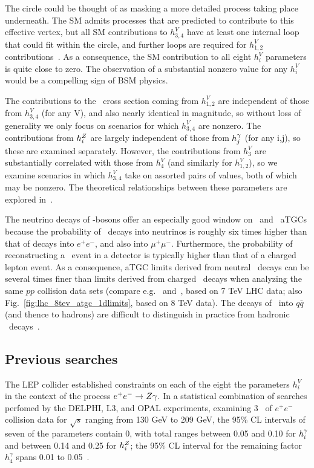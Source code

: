 \documentclass[oneside, letterpaper, 12pt, oldfontcommands]{memoir}
\begin{document}
The circle could be thought of as masking a more detailed process taking place underneath. The SM admits processes that are predicted to contribute
to this effective vertex, but all SM contributions to $h_{3,4}^{V}$ have at least one internal loop that could fit within the circle, and
further loops are required for $h_{1,2}^{V}$ contributions~\cite{ref:PhysRevD.47.4889}.
As a consequence, the SM contribution to all eight $h_{i}^{V}$ parameters is quite close to zero.
The observation of a substantial nonzero value for any $h_{i}^{V}$ would be a compelling sign of BSM physics.

The contributions to the \zinvg\ cross section coming from $h_{1,2}^{V}$ are independent of those from $h_{3,4}^{V}$ (for any V), and also nearly identical
in magnitude, so without loss of generality we only focus on scenarios for which $h_{3,4}^{V}$ are nonzero. The contributions
from $h_{i}^{Z}$ are largely independent of those from $h_{j}^{\gamma}$ (for any i,j), so these are examined separately.
However, the contributions from $h_{3}^{V}$ are substantially correlated with those from $h_{4}^{V}$ (and similarly for $h_{1,2}^{V}$), so we examine
scenarios in which $h_{3,4}^{V}$ take on assorted pairs of values, both of which may be nonzero. The theoretical relationships between these parameters
are explored in~\cite{ref:PhysRevD.47.4889}.

The neutrino decays of \PZ-bosons offer an especially good window on \PZ\PZ\Pgamma\ and \PZ\Pgamma\Pgamma\ aTGCs because the
probability of \PZ\ decays into neutrinos is roughly six times higher than that of decays into $e^\mathrm{+}e^\mathrm{-}$, and
also into $\mu^\mathrm{+}\mu^\mathrm{-}$. Furthermore, the probability of reconstructing a \zinvg\ event in a detector is typically
higher than that of a charged lepton event. As a consequence, aTGC limits derived from neutral \PZ\ decays can be several times
finer than limits derived from charged \PZ\ decays when analyzing the same $pp$ collision data sets (compare e.g.~\cite{ref:PhysRevD.89.092005} and~\cite{ref:JHEP10(2013)164},
based on 7 TeV LHC data; also Fig.~\ref{fig:lhc_8tev_atgc_1dlimits}, based on 8 TeV data).
The decays of \PZ\ into $q\bar{q}$ (and thence to hadrons) are difficult to distinguish in practice from hadronic \PW\ decays~\cite{ref:RevModPhys.89.035008}.

\subsection{Previous searches} \label{sec:introduction_aTGC_previous_searches}
The LEP collider established constraints on each of the eight the parameters $h_{i}^{V}$ in the context of the process $e^{\mathrm{+}}e^{\mathrm{-}} \to Z\gamma$.
In a statistical combination of searches perfomed by the DELPHI, L3, and OPAL experiments, examining 3 \fbinv\ of $e^{\mathrm{+}}e^{\mathrm{-}}$ collision data
for $\sqrt{s}$ ranging from 130 GeV to 209 GeV, the 95\% CL intervals of seven of the parameters contain 0, with total ranges between 0.05 and 0.10 for $h_{i}^{\gamma}$
and between 0.14 and 0.25 for $h_{i}^{Z}$; the 95\% CL interval for the remaining factor $h_{4}^{\gamma}$ spans 0.01 to 0.05~\cite{ref:j.physrep.2013.07.004}.
\end{document}

